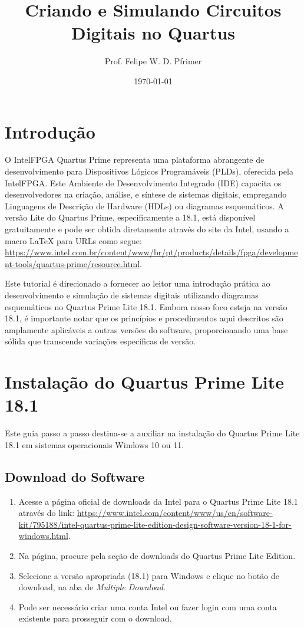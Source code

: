 \documentclass[12pt,a4paper]{article}
\title{\textbf{Criando e Simulando Circuitos Digitais no Quartus}}
\author{Prof. Felipe W. D. Pfrimer}
\date{\today}
\begin{document}
\maketitle
\tableofcontents
\newpage

\section{Introdução}

O IntelFPGA Quartus Prime representa uma plataforma abrangente de desenvolvimento para Dispositivos Lógicos Programáveis (PLDs), oferecida pela IntelFPGA. Este Ambiente de Desenvolvimento Integrado (IDE) capacita os desenvolvedores na criação, análise, e síntese de sistemas digitais, empregando Linguagens de Descrição de Hardware (HDLs) ou diagramas esquemáticos. A versão Lite do Quartus Prime, especificamente a 18.1, está disponível gratuitamente e pode ser obtida diretamente através do site da Intel, usando a macro LaTeX para URLs como segue: \url{https://www.intel.com.br/content/www/br/pt/products/details/fpga/development-tools/quartus-prime/resource.html}.

Este tutorial é direcionado a fornecer ao leitor uma introdução prática ao desenvolvimento e simulação de sistemas digitais utilizando diagramas esquemáticos no Quartus Prime Lite 18.1. Embora nosso foco esteja na versão 18.1, é importante notar que os princípios e procedimentos aqui descritos são amplamente aplicáveis a outras versões do software, proporcionando uma base sólida que transcende variações específicas de versão.

\section{Instalação do Quartus Prime Lite 18.1}

Este guia passo a passo destina-se a auxiliar na instalação do Quartus Prime Lite 18.1 em sistemas operacionais Windows 10 ou 11.

\subsection{Download do Software}

\begin{enumerate}
    \item Acesse a página oficial de downloads da Intel para o Quartus Prime Lite 18.1 através do link: \url{https://www.intel.com/content/www/us/en/software-kit/795188/intel-quartus-prime-lite-edition-design-software-version-18-1-for-windows.html}.
    \item Na página, procure pela seção de downloads do Quartus Prime Lite Edition.
    \item Selecione a versão apropriada (18.1) para Windows e clique no botão de download, na aba de \textit{Multiple Download}.
    \item Pode ser necessário criar uma conta Intel ou fazer login com uma conta existente para prosseguir com o download.
\end{enumerate}
\end{document}

